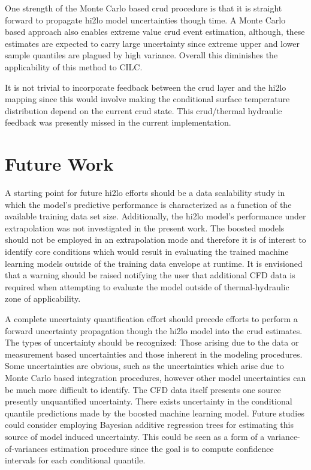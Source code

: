 One strength of the Monte Carlo based crud procedure is that it is straight forward to propagate hi2lo model uncertainties though time.  A Monte Carlo based approach also enables extreme value crud event estimation, although, these estimates are expected to carry large uncertainty since extreme upper and lower sample quantiles are plagued by high variance.  Overall this diminishes the applicability of this method to CILC.  

It is not trivial to incorporate feedback between the crud layer and the hi2lo mapping since this would involve making the conditional surface temperature distribution depend on the current crud state.  This crud/thermal hydraulic feedback was presently missed in the current implementation.


\section{Future Work}

A starting point for future hi2lo efforts should be a data scalability study in which the model's predictive performance is characterized as a function of the available training data set size.  Additionally,
the hi2lo model's performance under extrapolation was not investigated in the present work.  The boosted models should not be employed in an extrapolation mode and therefore it is of interest to identify core conditions which would result in evaluating the trained machine learning models outside of the training data envelope at runtime.  It is envisioned that a warning should be raised notifying the user that additional CFD data is required when attempting to evaluate the model outside of thermal-hydraulic zone of applicability.


A complete uncertainty quantification effort should precede efforts to perform a forward uncertainty propagation though the hi2lo model into the crud estimates.  The types of uncertainty should be recognized: Those arising due to the data or measurement based uncertainties and those inherent in the modeling procedures.  Some uncertainties are obvious, such as the uncertainties which arise due to Monte Carlo based integration procedures, however other model uncertainties can be much more difficult to identify.  The CFD data itself presents one source presently unquantified uncertainty.  There exists uncertainty in the conditional quantile predictions made by the boosted machine learning model.  Future studies could consider employing Bayesian additive regression trees for estimating this source of model induced uncertainty.  This could be seen as a form of a variance-of-variances estimation procedure since the goal is to compute confidence intervals for each conditional quantile.
    
